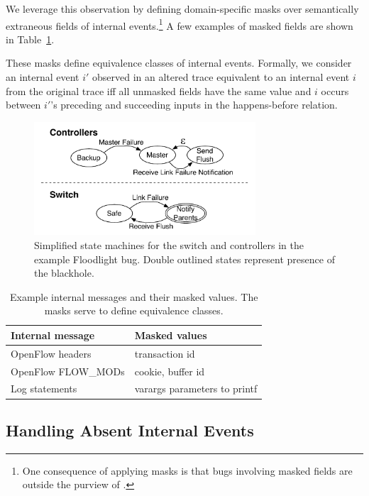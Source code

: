 We leverage this observation by defining
domain-specific masks over semantically extraneous fields of
internal events.\footnote{One consequence
of applying masks is that bugs involving masked fields are outside the purview of
\simulator.} A few examples of masked fields are shown
in Table~\ref{tab:fingerprints}.

These masks define equivalence classes
of internal events. Formally, we consider an internal event $i'$ observed in an altered trace
equivalent to an internal event $i$ from the original trace iff all unmasked
fields have the same value
and $i$ occurs between $i'$'s preceding and succeeding inputs in the
happens-before relation.

\begin{figure}[t]
    \includegraphics[width=3.25in]{../diagrams/state_machines/controller_switch.pdf}
    \caption[]{\label{fig:state_machines} Simplified state machines for the switch and
    controllers in the example Floodlight bug. Double outlined states
    represent presence of the blackhole.}
\end{figure}

\begin{table}
\centering
\begin{tabular}{|l|l|}
\hline
Internal message & Masked values \\
\hline
OpenFlow headers & transaction id\\
OpenFlow FLOW\_MODs & cookie, buffer id \\
Log statements & varargs parameters to printf \\
\hline
\end{tabular}
\caption{Example internal messages and their masked values. The masks serve to
define equivalence classes.}
\label{tab:fingerprints}
\end{table}

\subsection{Handling Absent Internal Events}
\label{subsec:divergence}

